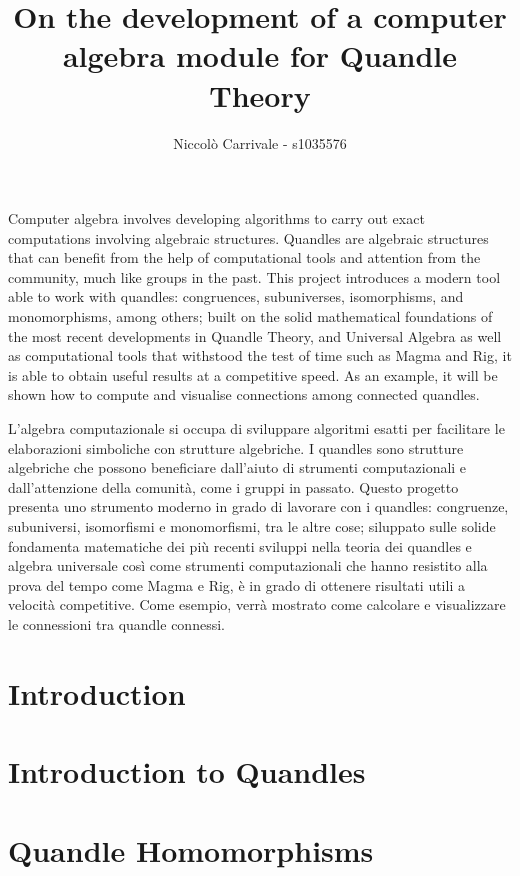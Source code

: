 \documentclass{mcom-l}
\begin{document}
\title{On the development of a computer algebra module for Quandle Theory}

\author{Niccolò Carrivale - s1035576}

\maketitle


Computer algebra involves developing algorithms to carry out exact computations involving algebraic structures. Quandles are algebraic structures that can benefit from the help of computational tools and attention from the community, much like groups in the past. This project introduces a modern tool able to work with quandles: congruences, subuniverses, isomorphisms, and monomorphisms, among others; built on the solid mathematical foundations of the most recent developments in Quandle Theory, and Universal Algebra as well as computational tools that withstood the test of time such as Magma and Rig, it is able to obtain useful results at a competitive speed. As an example, it will be shown how to compute and visualise connections among connected quandles. 

L'algebra computazionale si occupa di sviluppare algoritmi esatti per facilitare le elaborazioni simboliche con strutture algebriche. I quandles sono strutture algebriche che possono beneficiare dall'aiuto di strumenti computazionali e dall'attenzione della comunità, come i gruppi in passato. Questo progetto presenta uno strumento moderno in grado di lavorare con i quandles: congruenze, subuniversi, isomorfismi e monomorfismi, tra le altre cose; siluppato sulle solide fondamenta matematiche dei più recenti sviluppi nella teoria dei quandles e algebra universale così come strumenti computazionali che hanno resistito alla prova del tempo come Magma e Rig, è in grado di ottenere risultati utili a velocità competitive. Come esempio, verrà mostrato come calcolare e visualizzare le connessioni tra quandle connessi.



\section{Introduction}


\section{Introduction to Quandles}


\section{Quandle Homomorphisms}





\end{document}
